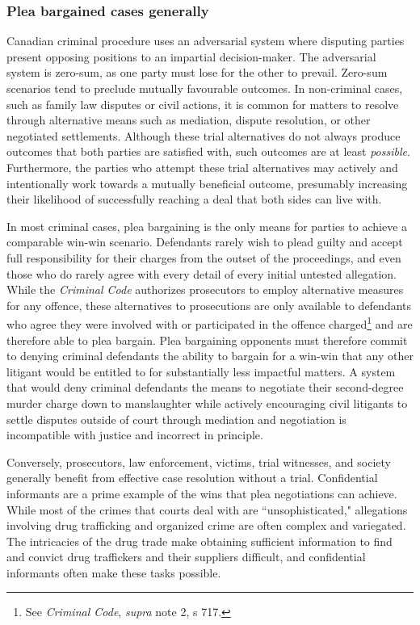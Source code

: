 \subsubsection{Plea bargained cases generally}

Canadian criminal procedure uses an adversarial system where disputing parties present opposing positions to an impartial decision-maker. The adversarial system is zero-sum, as one party must lose for the other to prevail. Zero-sum scenarios tend to preclude mutually favourable outcomes. In non-criminal cases, such as family law disputes or civil actions, it is common for matters to resolve through alternative means such as mediation, dispute resolution, or other negotiated settlements. Although these trial alternatives do not always produce outcomes that both parties are satisfied with, such outcomes are at least \textit{possible}. Furthermore, the parties who attempt these trial alternatives may actively and intentionally work towards a mutually beneficial outcome, presumably increasing their likelihood of successfully reaching a deal that both sides can live with.

In most criminal cases, plea bargaining is the only means for parties to achieve a comparable win-win scenario. Defendants rarely wish to plead guilty and accept full responsibility for their charges from the outset of the proceedings, and even those who do rarely agree with every detail of every initial untested allegation. While the \textit{Criminal Code} authorizes prosecutors to employ alternative measures for any offence, these alternatives to prosecutions are only available to defendants who agree they were involved with or participated in the offence charged\footnote{See \textit{Criminal Code}, \textit{supra} note 2, s 717.} and are therefore able to plea bargain. Plea bargaining opponents must therefore commit to denying criminal defendants the ability to bargain for a win-win that any other litigant would be entitled to for substantially less impactful matters. A system that would deny criminal defendants the means to negotiate their second-degree murder charge down to manslaughter while actively encouraging civil litigants to settle disputes outside of court through mediation and negotiation is incompatible with justice and incorrect in principle.

Conversely, prosecutors, law enforcement, victims, trial witnesses, and society generally benefit from effective case resolution without a trial. Confidential informants are a prime example of the wins that plea negotiations can achieve. While most of the crimes that courts deal with are ``unsophisticated," allegations involving drug trafficking and organized crime are often complex and variegated. The intricacies of the drug trade make obtaining sufficient information to find and convict drug traffickers and their suppliers difficult, and confidential informants often make these tasks possible.

